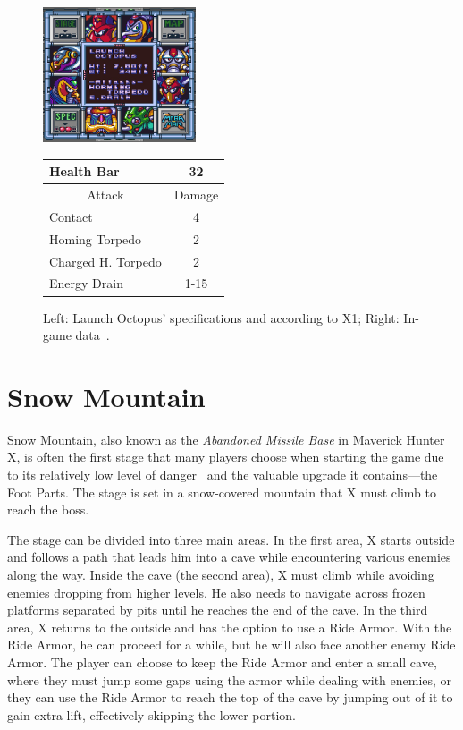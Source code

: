 \begin{figure}[htp]
	\begin{minipage}[c]{0.45\linewidth}
		\vspace{0pt}
		\centering
		\includegraphics[height=4cm]{figures/X1/Launch_octopus/Launch_octopus_specs.png}
	\end{minipage}
	\begin{minipage}[c]{0.45\linewidth}
		\centering
		\vspace{0pt}
		\begin{tabular}[h]{l c}
			\toprule
			Health Bar & 32\\
			\midrule
			\multicolumn{1}{c}{Attack} & \multicolumn{1}{c}{Damage}\\
			Contact & 4\\
			Homing Torpedo & 2\\
			Charged H. Torpedo & 2\\
			Energy Drain & 1-15\\
			\bottomrule
		\end{tabular}
	\end{minipage}
	\caption{Left: Launch Octopus' specifications and according to X1; Right: In-game data~\cite{wiki:Launch_octopus}. }
	\label{Octopus_specs}
\end{figure}


\section{Snow Mountain}

Snow Mountain, also known as the \textit{Abandoned Missile Base} in Maverick Hunter X, is often the first stage that many players choose when starting the game due to its relatively low level of danger~\cite{stratwiki:Snow_mountain} and the valuable upgrade it contains—the Foot Parts. The stage is set in a snow-covered mountain that X must climb to reach the boss.

The stage can be divided into three main areas. In the first area, X starts outside and follows a path that leads him into a cave while encountering various enemies along the way. Inside the cave (the second area), X must climb while avoiding enemies dropping from higher levels. He also needs to navigate across frozen platforms separated by pits until he reaches the end of the cave. In the third area, X returns to the outside and has the option to use a Ride Armor. With the Ride Armor, he can proceed for a while, but he will also face another enemy Ride Armor. The player can choose to keep the Ride Armor and enter a small cave, where they must jump some gaps using the armor while dealing with enemies, or they can use the Ride Armor to reach the top of the cave by jumping out of it to gain extra lift, effectively skipping the lower portion.

